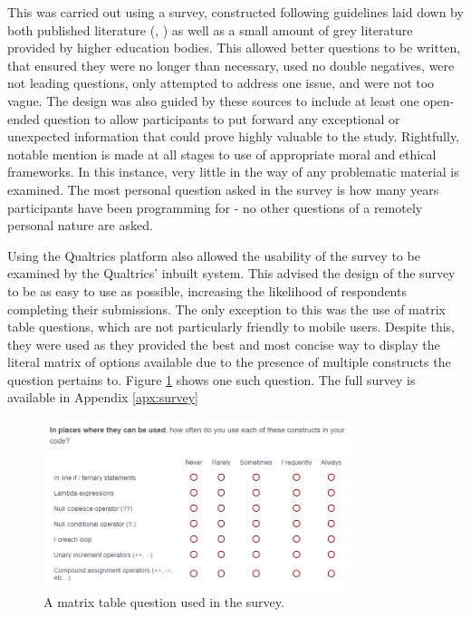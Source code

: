 \documentclass{article}
\begin{document}
        This was carried out using a survey, constructed following guidelines laid down by both published literature (\cite{goodSurveys1}, \cite{goodSurveys2}) as well as a small amount of grey literature provided by higher education bodies. This allowed better questions to be written, that ensured they were no longer than necessary, used no double negatives, were not leading questions, only attempted to address one issue, and were not too vague. The design was also guided by these sources to include at least one open-ended question to allow participants to put forward any exceptional or unexpected information that could prove highly valuable to the study. Rightfully, notable mention is made at all stages to use of appropriate moral and ethical frameworks. In this instance, very little in the way of any problematic material is examined. The most personal question asked in the survey is how many years participants have been programming for - no other questions of a remotely personal nature are asked.

        Using the Qualtrics platform also allowed the usability of the survey to be examined by the Qualtrics' inbuilt system. This advised the design of the survey to be as easy to use as possible, increasing the likelihood of respondents completing their submissions. The only exception to this was the use of matrix table questions, which are not particularly friendly to mobile users. Despite this, they were used as they provided the best and most concise way to display the literal matrix of options available due to the presence of multiple constructs the question pertains to. Figure \ref{fig:matrixTable} shows one such question. The full survey is available in Appendix \ref{apx:survey}
        
        \begin{figure}[htbp]
            \centering
            \includegraphics[width=0.8\textwidth]{matrixTable}
            \caption{A matrix table question used in the survey.}
            \label{fig:matrixTable}
        \end{figure}
\end{document}
